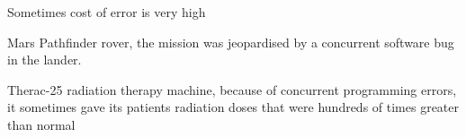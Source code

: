 \documentclass[12pt]{beamer}
\begin{document}
  \begin{frame}{Sometimes cost of error is very high}
      \begin{alertblock}{Mars Pathfinder}
          rover, the mission was jeopardised by a concurrent
          software bug in the lander.~\cite{Pathfinder2013}
      \end{alertblock}
      \begin{alertblock}{Therac-25}
          radiation therapy machine, because of concurrent
          programming errors, it sometimes gave its patients radiation doses
          that were hundreds of times greater than normal~\cite{wiki:therac}
      \end{alertblock}
  \end{frame}
\end{document}
